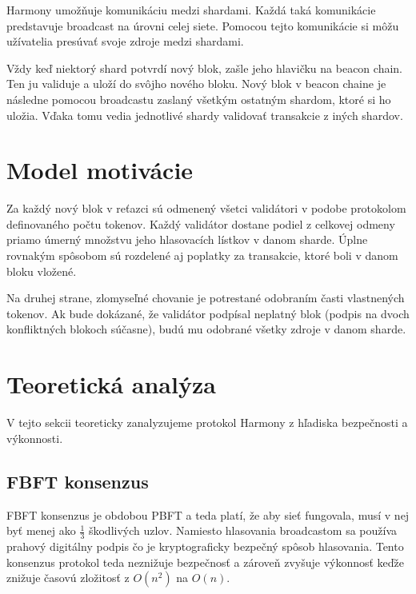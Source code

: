 Harmony umožňuje komunikáciu medzi shardami. Každá taká komunikácie predstavuje broadcast na úrovni celej siete. Pomocou tejto komunikácie si môžu užívatelia presúvať svoje zdroje medzi shardami. 

Vždy keď niektorý shard potvrdí nový blok, zašle jeho hlavičku na beacon chain. Ten ju validuje a uloží do svôjho nového bloku. Nový blok v beacon chaine je následne pomocou broadcastu zaslaný všetkým ostatným shardom, ktoré si ho uložia. Vďaka tomu vedia jednotlivé shardy validovať transakcie z iných shardov.

\section{Model motivácie}\label{sec:harmony-incenctives}

Za každý nový blok v reťazci sú odmenený všetci validátori v podobe protokolom definovaného počtu tokenov. Každý validátor dostane podiel z celkovej odmeny priamo úmerný množstvu jeho hlasovacích lístkov v danom sharde. Úplne rovnakým spôsobom sú rozdelené aj poplatky za transakcie, ktoré boli v danom bloku vložené.

Na druhej strane, zlomyseľné chovanie je potrestané odobraním časti vlastnených tokenov. Ak bude dokázané, že validátor podpísal neplatný blok (podpis na dvoch konfliktných blokoch súčasne), budú mu odobrané všetky zdroje v danom sharde.

\section{Teoretická analýza}\label{sec:harmony-analyze}
V tejto sekcii teoreticky zanalyzujeme protokol Harmony z hľadiska bezpečnosti a výkonnosti.

\subsection{FBFT konsenzus}
FBFT konsenzus je obdobou PBFT a teda platí, že aby sieť fungovala, musí v nej byť menej ako $\frac{1}{3}$ škodlivých uzlov. Namiesto hlasovania broadcastom sa používa prahový digitálny podpis čo je kryptograficky bezpečný spôsob hlasovania. Tento konsenzus protokol teda neznižuje bezpečnosť a zároveň zvyšuje výkonnosť keďže znižuje časovú zložitosť z $O(n^2)$ na $O(n)$.

